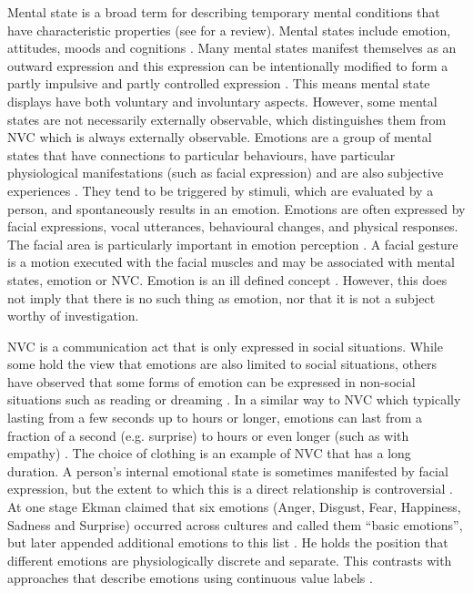
Mental state is a broad term for describing temporary mental conditions that have characteristic properties (see \cite{Perner1999} for a review). Mental states include emotion, attitudes, moods and cognitions \cite{Martin1990}. Many mental states manifest themselves as an outward expression and this expression can be intentionally modified to form a partly impulsive and partly controlled expression \cite{Frith2009}. This means mental state displays have both voluntary and involuntary aspects. However, some mental states are not necessarily externally observable, which distinguishes them from \ac{NVC} which is always externally observable. Emotions are a group of mental states that have connections to particular behaviours, have particular physiological manifestations (such as facial expression) and are also subjective experiences \cite{Frijda1986}. They tend to be triggered by stimuli, which are evaluated by a person, and spontaneously results in an emotion. Emotions are often expressed by facial expressions, vocal utterances, behavioural changes, and physical responses. The facial area is particularly important in emotion perception \cite{Ekman2009}. A facial gesture is a motion executed with the facial muscles and may be associated with mental states, emotion or \ac{NVC}. Emotion is an ill defined concept \cite{BeckerAsano2011, Shaver1987, Fehr1984}.
However, this does not imply that there is no such thing as emotion, nor that it is not a subject worthy of investigation.

\ac{NVC} is a communication act that is only expressed in social situations. While some hold the view that emotions are also limited to social situations, others have observed that some forms of emotion can be expressed in non-social situations such as reading \cite{Mar2008} or dreaming \cite{Nielsen1991}. In a similar way to \ac{NVC} which typically lasting from a few seconds \cite{Lee1998} up to hours or longer, emotions can last from a fraction of a second (e.g. surprise) to hours or even longer (such as with empathy) \cite{Aaron1997, Verduyn2009}. The choice of clothing is an example of \ac{NVC} that has a long duration. A person's internal emotional state is sometimes manifested by facial expression, but the extent to which this is a direct relationship is controversial \cite{Azar2000}. At one stage Ekman claimed that six emotions (Anger, Disgust, Fear, Happiness, Sadness and Surprise) occurred across cultures \cite{Ekman1972} and called them ``basic emotions'', but later appended additional emotions to this list \cite{Ekman99}. He holds the position that different emotions are physiologically discrete and separate. This contrasts with approaches that describe emotions using continuous value labels \cite{Cowie2005}.

